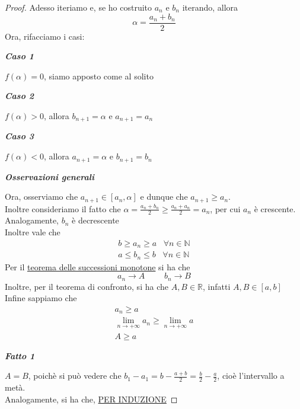 \documentclass{article}
\theoremstyle{definition}
\newcommand{\N}{\mathbb{N}}
\begin{document}
\begin{proof}
Adesso iteriamo e, se ho costruito $a_n$ e $b_n$ iterando, allora
\begin{equation}
    \alpha = \frac{a_n+b_n}{2}
\end{equation}
Ora, rifacciamo i casi:
\begin{center}
    \textbf{\textit{Caso 1}}
\end{center}
$f(\alpha) = 0$, siamo apposto come al solito
\begin{center}
    \textbf{\textit{Caso 2}}
\end{center}
$f(\alpha) > 0$, allora $b_{n+1}=\alpha$ e $a_{n+1}=a_n$
\begin{center}
    \textbf{\textit{Caso 3}}
\end{center}
$f(\alpha) < 0$, allora $a_{n+1}=\alpha$ e $b_{n+1}=b_n$
\begin{center}
    \textbf{\textit{Osservazioni generali}}
\end{center}
Ora, osserviamo che $a_{n+1} \in [a_n, \alpha]$ e dunque che $a_{n+1} \geqslant a_n$.
\\
Inoltre consideriamo il fatto che $\alpha = \frac{a_n+b_n}{2} \geqslant \frac{a_n+a_n}{2}=a_n$, per cui $a_n$ è crescente.
\\
Analogamente, $b_n$ è decrescente
\\
Inoltre vale che 
\begin{align}
    b \geqslant a_n \geqslant a \,\,\,\,\, \forall n \in \N \\
    a \leqslant b_n \leqslant b \,\,\,\,\, \forall n \in \N 
\end{align}
Per il \underline{teorema delle successioni monotone} si ha che
\begin{equation}
    a_n \to A \,\,\,\,\,\,\,\,\,\,\,\,\,\, b_n\to B
\end{equation}
Inoltre, per il teorema di confronto, si ha che $A,B \in \mathbb{R}$, infatti $A,B \in [a,b]$
\\
Infine sappiamo che 
\begin{align}
    a_n \geqslant a \\
    \lim_{n \to +\infty }a_n \geqslant \lim_{n \to +\infty} a \\
    A \geqslant a
\end{align}
\begin{center}
    \textbf{\textit{Fatto 1}}
\end{center}
$A=B$, poichè si può vedere che $b_1-a_1=b-\frac{a+b}{2}=\frac{b}{2}-\frac{a}{2}$, cioè l'intervallo a metà.
\\
Analogamente, si ha che, \underline{PER INDUZIONE}

\end{proof}
\end{document}
